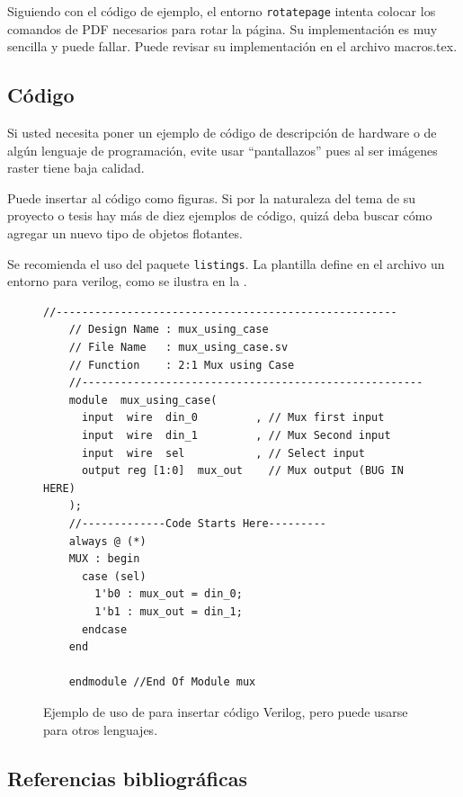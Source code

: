 Siguiendo con el código de ejemplo, el entorno \verb+rotatepage+
intenta colocar los comandos de PDF necesarios para rotar la página.
Su implementación es muy sencilla y puede fallar.  Puede revisar su
implementación en el archivo {macros.tex}.



\subsection{Código}

Si usted necesita poner un ejemplo de código de descripción de
hardware o de algún lenguaje de programación, evite usar
``pantallazos'' pues al ser imágenes raster tiene baja calidad.

Puede insertar al código como figuras.  Si por la naturaleza del tema
de su proyecto o tesis hay más de diez ejemplos de código, quizá deba
buscar cómo agregar un nuevo tipo de objetos flotantes.

Se recomienda el uso del paquete \verb+listings+.  La plantilla define
en el archivo  un entorno para verilog, como se ilustra en la .

\begin{figure}[htb]
  \begin{lstlisting}[style={verilog-style}]
    //-----------------------------------------------------
    // Design Name : mux_using_case
    // File Name   : mux_using_case.sv
    // Function    : 2:1 Mux using Case
    //-----------------------------------------------------
    module  mux_using_case(
      input  wire  din_0         , // Mux first input
      input  wire  din_1         , // Mux Second input
      input  wire  sel           , // Select input
      output reg [1:0]  mux_out    // Mux output (BUG IN HERE)
    );
    //-------------Code Starts Here---------
    always @ (*)
    MUX : begin
      case (sel) 
        1'b0 : mux_out = din_0;
        1'b1 : mux_out = din_1;
      endcase 
    end 
    
    endmodule //End Of Module mux
  \end{lstlisting}
  \caption[Ejemplo de código con listings.]{Ejemplo de uso de 
    para insertar código Verilog, pero puede usarse para otros
    lenguajes.}
  \label{fig:verilog}
\end{figure}

\subsection{Referencias bibliográficas}

